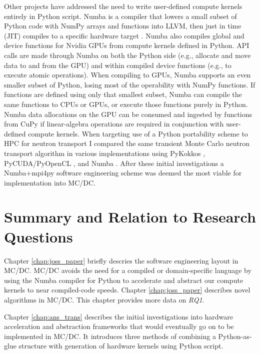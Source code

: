 Other projects have addressed the need to write user-defined compute kernels entirely in Python script.
Numba is a compiler that lowers a small subset of Python code with NumPy arrays and functions into LLVM, then just in time (JIT) compiles to a specific hardware target \cite{lam_numba_2015}. 
Numba also compiles global and device functions for Nvidia GPUs from compute kernels defined in Python.
API calls are made through Numba on both the Python side (e.g., allocate and move data to and from the GPU) and within compiled device functions (e.g., to execute atomic operations).
When compiling to GPUs, Numba supports an even smaller subset of Python, losing most of the operability with NumPy functions.
If functions are defined using only that smallest subset, Numba can compile the same functions to CPUs or GPUs, or execute those functions purely in Python.
Numba data allocations on the GPU can be consumed and ingested by functions from CuPy if linear-algebra operations are required in conjunction with user-defined compute kernels.
When targeting use of a Python portability scheme to HPC for neutron transport I compared the same transient Monte Carlo neutron transport algorithm in various implementations \cite{morgan2022} using PyKokkos \cite{AlAwarETAL21PyKokkos}, PyCUDA/PyOpenCL \cite{kloeckner_pycuda_2012}, and Numba \cite{lam_numba_2015}.
After these initial investigations a Numba+mpi4py software engineering scheme was deemed the most viable for implementation into MC/DC.

\section{Summary and Relation to Research Questions}


Chapter \ref{chap:joss_paper} briefly descries the software engineering layout in MC/DC. MC/DC avoids the need for a compiled or domain-specific language by using the Numba compiler for Python to accelerate and abstract our compute kernels to near compiled-code speeds.
Chapter \ref{chap:joss_paper} describes novel algorithms in MC/DC.
This chapter provides more data on \emph{RQ1}.

Chapter \ref{chap:ans_trans} describes the initial investigations into hardware acceleration and abstraction frameworks that would eventually go on to be implemented in MC/DC.
It introduces three methods of combining a Python-as-glue structure with generation of hardware kernels using Python script.

